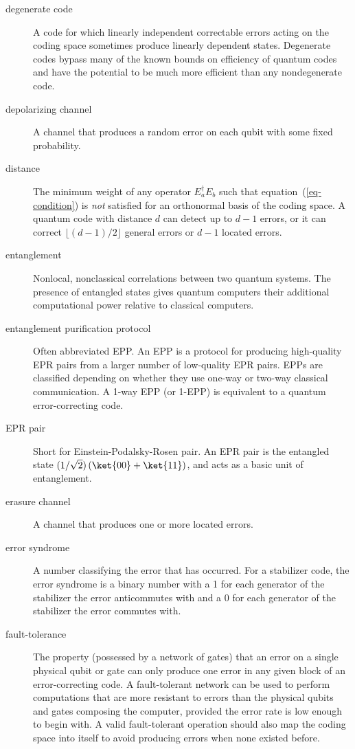 \begin{description}
	\item[degenerate code] A code for which linearly independent correctable
	errors acting on the coding space sometimes produce linearly dependent states.
	Degenerate codes bypass many of the known bounds on efficiency of quantum
	codes and have the potential to be much more efficient than any
	nondegenerate code.

	\item[depolarizing channel] A channel that produces a random error on each
	qubit with some fixed probability.

	\item[distance] The minimum weight of any operator $E_a^\dagger E_b$ such that
	equation~(\ref{eq-condition}) is {\em not} satisfied for an orthonormal
	basis of the coding space.  A quantum code with distance $d$ can detect
	up to $d-1$ errors, or it can correct $\lfloor (d-1)/2 \rfloor$ general
	errors or $d-1$ located errors.

	\item[entanglement] Nonlocal, nonclassical correlations between two quantum
	systems.  The presence of entangled states gives quantum computers their
	additional computational power relative to classical computers.

	\item[entanglement purification protocol] Often abbreviated EPP.  An EPP is
	a protocol for producing high-quality EPR pairs from a larger number of
	low-quality EPR pairs.  EPPs are classified depending on whether they use
	one-way or two-way classical communication.  A 1-way EPP (or 1-EPP) is
	equivalent to a quantum error-correcting code.

	\item[EPR pair] Short for Einstein-Podalsky-Rosen pair.  An EPR pair is
	the entangled state $(1/ \sqrt{2}) \left(\ket{00} + \ket{11} \right)$, and
	acts as a basic unit of entanglement.

	\item[erasure channel] A channel that produces one or more located errors.

	\item[error syndrome] A number classifying the error that has occurred.  For
	a stabilizer code, the error syndrome is a binary number with a 1 for each
	generator of the stabilizer the error anticommutes with and a 0 for each
	generator of the stabilizer the error commutes with.

	\item[fault-tolerance] The property (possessed by a network of gates) that an
	error on a single physical qubit or gate can only produce one error in any
	given block of an error-correcting code.  A fault-tolerant network can be
	used to perform computations that are more resistant to errors than the
	physical qubits and gates composing the computer, provided the error rate
	is low enough to begin with.  A valid fault-tolerant operation should also
	map the coding space into itself to avoid producing errors when none existed
	before.


\end{description}
